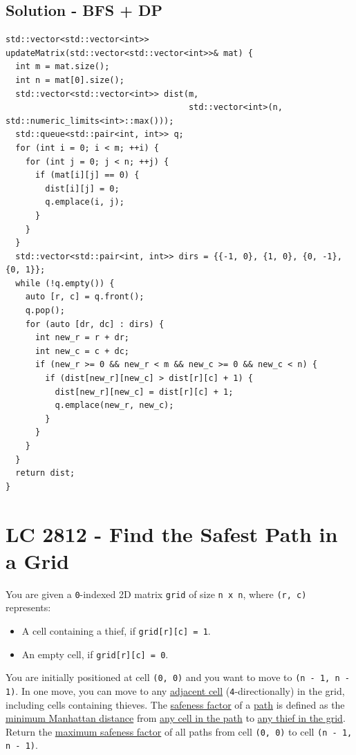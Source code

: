 \subsection*{Solution - BFS + DP}
\begin{lstlisting}
std::vector<std::vector<int>> updateMatrix(std::vector<std::vector<int>>& mat) {
  int m = mat.size();
  int n = mat[0].size();
  std::vector<std::vector<int>> dist(m,
                                     std::vector<int>(n, std::numeric_limits<int>::max()));
  std::queue<std::pair<int, int>> q;
  for (int i = 0; i < m; ++i) {
    for (int j = 0; j < n; ++j) {
      if (mat[i][j] == 0) {
        dist[i][j] = 0;
        q.emplace(i, j);
      }
    }
  }
  std::vector<std::pair<int, int>> dirs = {{-1, 0}, {1, 0}, {0, -1}, {0, 1}};
  while (!q.empty()) {
    auto [r, c] = q.front();
    q.pop();
    for (auto [dr, dc] : dirs) {
      int new_r = r + dr;
      int new_c = c + dc;
      if (new_r >= 0 && new_r < m && new_c >= 0 && new_c < n) {
        if (dist[new_r][new_c] > dist[r][c] + 1) {
          dist[new_r][new_c] = dist[r][c] + 1;
          q.emplace(new_r, new_c);
        }
      }
    }
  }
  return dist;
}
\end{lstlisting}

\section{LC 2812 - Find the Safest Path in a Grid}
You are given a {\colorbox{CodeBackground}{\lstinline|0|}}-indexed 2D matrix {\colorbox{CodeBackground}{\lstinline|grid|}} of size {\colorbox{CodeBackground}{\lstinline|n x n|}}, where {\colorbox{CodeBackground}{\lstinline|(r, c)|}} represents:
\begin{itemize}
\item A cell containing a thief, if {\colorbox{CodeBackground}{\lstinline|grid[r][c] = 1|}}.
\item An empty cell, if {\colorbox{CodeBackground}{\lstinline|grid[r][c] = 0|}}.
\end{itemize}

You are initially positioned at cell {\colorbox{CodeBackground}{\lstinline|(0, 0)|}} and you want to move to {\colorbox{CodeBackground}{\lstinline|(n - 1, n - 1)|}}. In one move, you can move to any \ul{adjacent cell} ({\colorbox{CodeBackground}{\lstinline|4|}}-directionally) in the grid, including cells containing thieves. The \ul{safeness factor} of a \ul{path} is defined as the \ul{minimum Manhattan distance} from \ul{any cell in the path} to \ul{any thief in the grid}. Return the \ul{maximum safeness factor} of all paths from cell {\colorbox{CodeBackground}{\lstinline|(0, 0)|}} to cell {\colorbox{CodeBackground}{\lstinline|(n - 1, n - 1)|}}. \\

